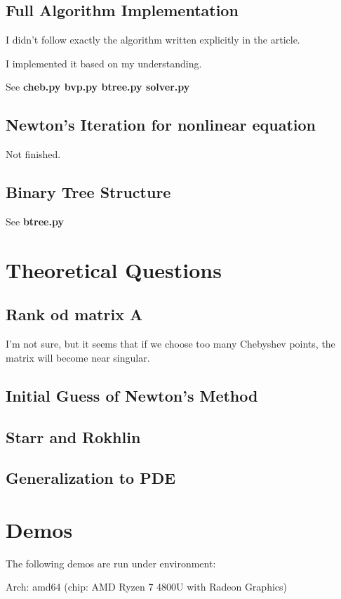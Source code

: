\documentclass{article}
\begin{document}
\subsection{Full Algorithm Implementation}
I didn't follow exactly the algorithm written explicitly in the article.

I implemented it based on my understanding.

See {\bf cheb.py bvp.py btree.py solver.py}

\subsection{Newton's Iteration for nonlinear equation}
Not finished.

\subsection{Binary Tree Structure}
See {\bf btree.py}

\section{Theoretical Questions}
\subsection{Rank od matrix A}
I'm not sure, but it seems that if we choose too many Chebyshev points, 
the matrix will become near singular.

\subsection{Initial Guess of Newton's Method}

\subsection{Starr and Rokhlin}

\subsection{Generalization to PDE}

\section{Demos}

The following demos are run under environment:
\bigskip

Arch: amd64 (chip: AMD Ryzen 7 4800U with Radeon Graphics)
\end{document}

